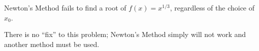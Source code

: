 \begin{marginfigure}[-10cm] %
\begin{center}


\caption{Newton's Method fails to find a root of $f(x) = x^{1/3}$, regardless of the choice of $x_0$.}\label{fig:newt4}
\end{center}
\end{marginfigure}

There is no ``fix'' to this problem; Newton's Method simply will not work and another method must be used.

